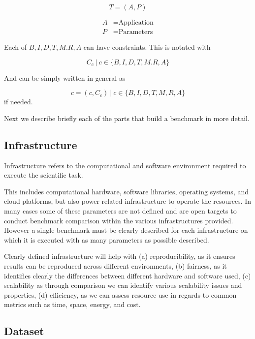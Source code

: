 \[ T = (A, P) \]

\[
\begin{array}{ll}
A & = \text{Application} \\
P & = \text{Parameters}
\end{array}
\]

Each of $B, I, D, T, M. R, A$ can have constraints. This is notated with 

\[C_c ~|~ c \in \{B, I, D, T, M. R, A\}\]

And can be simply written in general as 

\[ c = (c, C_c) ~|~ c \in \{B, I, D, T, M, R, A\} \]
if needed.

 Next we describe briefly each of the parts that build a benchmark in more detail.

\subsection{Infrastructure}
\label{subsec:towards-infra}

Infrastructure refers to the computational and software environment required to execute the scientific task.

This includes computational hardware, software libraries, operating systems, and cloud platforms, but also power related infrastructure to operate the resources.
In many cases some of these parameters are not defined and are open targets to conduct benchmark comparison within the various infrastructures provided.
However a single benchmark must be clearly described for each infrastructure on which it is executed with as many parameters as possible described.

Clearly defined infrastructure will help with (a) reproducibility, as it ensures results can be reproduced across different environments, (b) fairness, as it identifies clearly the differences between different hardware and  software used, (c) scalability as through comparison we can identify various scalability issues and properties, (d) efficiency, as we can assess  resource use in regards to common metrics such as time, space, energy, and cost.

\subsection{Dataset}
\label{subsec:towards-dataset}


